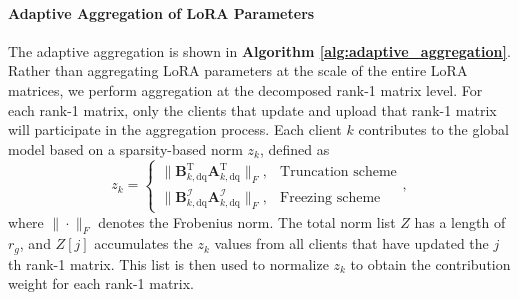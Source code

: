 \documentclass[journal]{IEEEtran}
\begin{document}
\paragraph{Adaptive Aggregation of LoRA Parameters}
The adaptive aggregation is shown in \textbf{Algorithm \ref{alg:adaptive_aggregation}}. Rather than aggregating LoRA parameters at the scale of the entire LoRA matrices, we perform aggregation at the decomposed rank-1 matrix level. For each rank-1 matrix, only the clients that update and upload that rank-1 matrix will participate in the aggregation process.
Each client \(k\) contributes to the global model based on a sparsity-based norm \(z_k\), defined as
\begin{equation}
z_k = 
\begin{cases} 
\|\mathbf{B}_{k,\text{dq}}^{\text{T}}\mathbf{A}_{k,\text{dq}}^{\text{T}}\|_F, & \text{Truncation scheme} \\
\|\mathbf{B}_{k,\text{dq}}^{\mathcal{I}}\mathbf{A}_{k,\text{dq}}^{\mathcal{I}}\|_F, & \text{Freezing scheme}
\end{cases},
\end{equation}
where \(\|\cdot\|_F\) denotes the Frobenius norm. The total norm list $Z$ has a length of $r_g$, and $Z[j]$ accumulates the $z_k$ values from all clients that have updated the $j$th rank-1 matrix. This list is then used to normalize $z_k$ to obtain the contribution weight for each rank-1 matrix.
\end{document}
